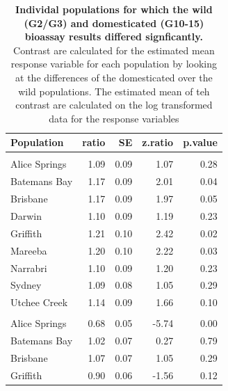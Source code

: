 \documentclass[]{article}
\begin{document}
\begin{table}[t]

\caption{\label{tab:S3 Table}\textbf{Individal populations for which the wild (G2/G3) and domesticated (G10-15) bioassay results differed signficantly.} Contrast are calculated for the estimated mean response variable for each population by looking at the differences of the domesticated over the wild populations. The estimated mean of teh contrast are calculated on the log transformed data for the response variables}
\centering
\begin{tabular}{lrrrr}
\toprule
Population & ratio & SE & z.ratio & p.value\\
\midrule
\addlinespace[0.3em]
\multicolumn{5}{l}{\textbf{Heat}}\\
\hspace{1em}Alice Springs & 1.09 & 0.09 & 1.07 & 0.28\\
\hspace{1em}Batemans Bay & 1.17 & 0.09 & 2.01 & 0.04\\
\hspace{1em}Brisbane & 1.17 & 0.09 & 1.97 & 0.05\\
\hspace{1em}Darwin & 1.10 & 0.09 & 1.19 & 0.23\\
\hspace{1em}Griffith & 1.21 & 0.10 & 2.42 & 0.02\\
\hspace{1em}Mareeba & 1.20 & 0.10 & 2.22 & 0.03\\
\hspace{1em}Narrabri & 1.10 & 0.09 & 1.20 & 0.23\\
\hspace{1em}Sydney & 1.09 & 0.08 & 1.05 & 0.29\\
\hspace{1em}Utchee Creek & 1.14 & 0.09 & 1.66 & 0.10\\
\addlinespace[0.3em]
\multicolumn{5}{l}{\textbf{Desiccation}}\\
\hspace{1em}Alice Springs & 0.68 & 0.05 & -5.74 & 0.00\\
\hspace{1em}Batemans Bay & 1.02 & 0.07 & 0.27 & 0.79\\
\hspace{1em}Brisbane & 1.07 & 0.07 & 1.05 & 0.29\\
\hspace{1em}Griffith & 0.90 & 0.06 & -1.56 & 0.12\\

\end{tabular}
\end{table}
\end{document}
